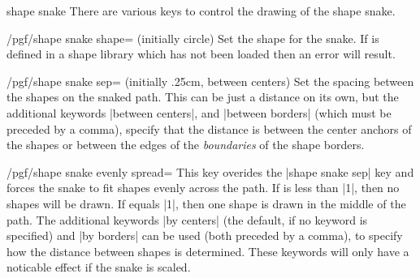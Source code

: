 \begin{decoration}{shape snake}
  There are various keys to control the drawing of the shape snake.

\begin{key}{/pgf/shape snake shape= (initially circle)}
  Set the shape for the snake. If  is defined in a shape
  library which has not been loaded then an error will result.
\end{key}

\begin{key}{/pgf/shape snake sep= (initially {.25cm, between centers})}
  Set the spacing between the shapes on the snaked path. This can be
  just a distance on its own, but the additional keywords 
  |between centers|, and |between borders| (which must be preceded by a 
  comma), specify that the distance	is between the center anchors of 
  the shapes or between the edges of the \emph{boundaries} of
  the shape borders.
	
\begin{codeexample}[]
\end{codeexample}

\end{key}


  
\begin{key}{/pgf/shape snake evenly spread=}
  This key overides the |shape snake sep| key and forces the snake to
  fit  shapes evenly across the path. 
  If  is less than |1|, then no shapes will be drawn. 
  If  equals |1|, then one shape is drawn in the middle 
  of the path. 
  The additional keywords |by centers| (the default, if no keyword is
  specified) and |by borders| can be used (both preceded by a comma), 
  to specify how the distance between shapes is determined. These
  keywords will only have a noticable effect if the snake is scaled.
  

\end{key}
\end{decoration}
